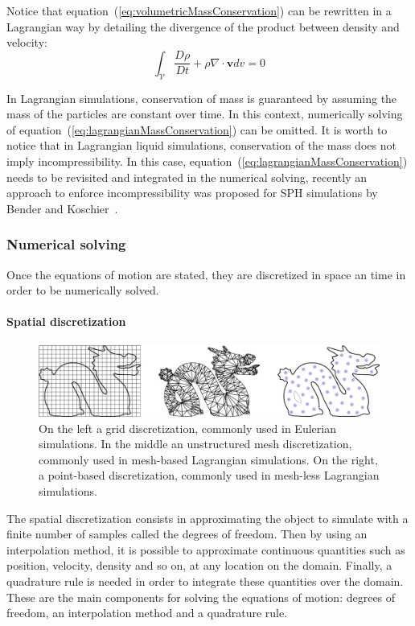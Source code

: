 Notice that equation~(\ref{eq:volumetricMassConservation}) can be rewritten in a Lagrangian way by detailing the divergence of the product between density and velocity:
\begin{equation}
\label{eq:lagrangianMassConservation}
\int_{\mathcal{V}} \frac{D\rho}{Dt} + \rho \nabla \cdot \mathbf{v} dv = 0
\end{equation}

In Lagrangian simulations, conservation of mass is guaranteed by assuming the mass of the particles are constant over time. In this context, numerically solving of equation~(\ref{eq:lagrangianMassConservation}) can be omitted. It is worth to notice that in Lagrangian liquid simulations, conservation of the mass does not imply incompressibility. In this case, equation~(\ref{eq:lagrangianMassConservation}) needs to be revisited and integrated in the numerical solving, recently an approach to enforce incompressibility was proposed for SPH simulations by Bender and Koschier~\cite{Bender2015}.

\subsubsection{Numerical solving}

Once the equations of motion are stated, they are discretized in space an time in order to be numerically solved.

\paragraph{Spatial discretization}

\begin{figure}[!ht]
\centering
\includegraphics[scale=0.2]{images/continuum_mechanics/discretization.png}
\caption[STAR mechanics: Discretization]{\label{fig:discretization} On the left a grid discretization, commonly used in Eulerian simulations. In the middle an unstructured mesh discretization, commonly used in mesh-based Lagrangian simulations. On the right, a point-based discretization, commonly used in mesh-less Lagrangian simulations.}
\end{figure}

The spatial discretization consists in approximating the object to simulate with a finite number of samples called the degrees of freedom. Then by using an interpolation method, it is possible to approximate continuous quantities such as position, velocity, density and so on,  at any location on the domain. Finally, a quadrature rule is needed in order to integrate these quantities over the domain. These are the main components for solving the equations of motion:
degrees of freedom, an interpolation method and a quadrature rule. 

